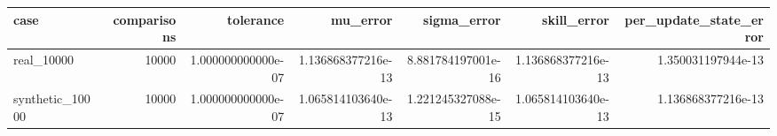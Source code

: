 \begin{tabular}{lrrrrrr}
\toprule
case & comparisons & tolerance & mu_error & sigma_error & skill_error & per_update_state_error \\
\midrule
real_10000 & 10000 & 1.000000000000e-07 & 1.136868377216e-13 & 8.881784197001e-16 & 1.136868377216e-13 & 1.350031197944e-13 \\
synthetic_10000 & 10000 & 1.000000000000e-07 & 1.065814103640e-13 & 1.221245327088e-15 & 1.065814103640e-13 & 1.136868377216e-13 \\
\bottomrule
\end{tabular}
